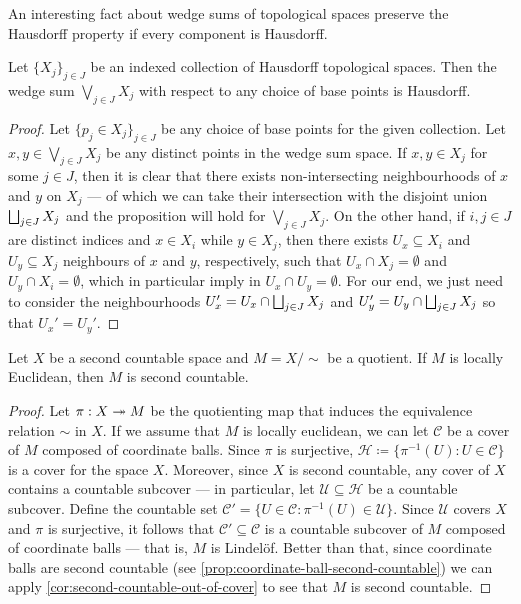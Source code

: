 An interesting fact about wedge sums of topological spaces preserve the
Hausdorff property if every component is Hausdorff.

\begin{proposition}
\label{prop:hausdorff-wedge-sum}
Let \(\{X_{j}\}_{j \in J}\) be an indexed collection of Hausdorff topological
spaces. Then the wedge sum \(\bigvee_{j \in J} X_j\) with respect to any choice
of base points is Hausdorff.
\end{proposition}

\begin{proof}
Let \(\{p_j \in X_j\}_{j \in J}\) be any choice of base points for the given
collection. Let \(x, y \in \bigvee_{j \in J} X_j\) be any distinct points in the
wedge sum space. If \(x, y \in X_j\) for some \(j \in J\), then it is clear that
there exists non-intersecting neighbourhoods of \(x\) and \(y\) on \(X_j\) ---
of which we can take their intersection with the disjoint union \(\bigsqcup_{j \in
J} X_j\) and the proposition will hold for \(\bigvee_{j \in J} X_j\). On the
other hand, if \(i, j \in J\) are distinct indices and \(x \in X_i\) while \(y
\in X_j\), then there exists \(U_x \subseteq X_i\) and \(U_y \subseteq X_j\)
neighbours of \(x\) and \(y\), respectively, such that \(U_x \cap X_j =
\emptyset\) and \(U_y \cap X_i = \emptyset\), which in particular imply in \(U_x
\cap U_y= \emptyset\). For our end, we just need to consider the neighbourhoods
\(U_x' = U_x \cap \bigsqcup_{j \in J} X_j\) and \(U_y' = U_y \cap \bigsqcup_{j \in J}
X_j\) so that \(U_x' = U_y'\).
\end{proof}

\begin{proposition}
\label{prop:quot-second-count-locall-euclidean}
Let \(X\) be a second countable space and \(M = X / {\sim}\) be a quotient. If
\(M\) is locally Euclidean, then \(M\) is second countable.
\end{proposition}

\begin{proof}
Let \(\pi: X \twoheadrightarrow M\) be the quotienting map that induces the equivalence
relation \(\sim\) in \(X\). If we assume that \(M\) is locally euclidean, we can
let \(\mathcal{C}\) be a cover of \(M\) composed of coordinate balls. Since
\(\pi\) is surjective, \(\mathcal H \coloneq \{\pi^{-1}(U) \colon U \in
\mathcal{C}\}\) is a cover for the space \(X\). Moreover, since \(X\) is second
countable, any cover of \(X\) contains a countable subcover --- in particular,
let \(\mathcal U \subseteq \mathcal H\) be a countable subcover. Define the
countable set \(\mathcal{C}' = \{U \in \mathcal{C} \colon \pi^{-1}(U) \in
\mathcal{U}\}\). Since \(\mathcal{U}\) covers \(X\) and \(\pi\) is surjective,
it follows that \(\mathcal{C}' \subseteq \mathcal{C}\) is a countable subcover
of \(M\) composed of coordinate balls --- that is, \(M\) is Lindelöf. Better
than that, since coordinate balls are second countable (see
\cref{prop:coordinate-ball-second-countable}) we can apply
\cref{cor:second-countable-out-of-cover} to see that \(M\) is second
countable.
\end{proof}

